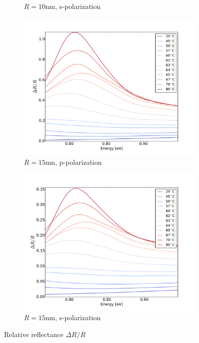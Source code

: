 \begin{figure}
\begin{subfigure}[b]{0.49\textwidth}
        \caption{$R=10$nm, s-polarization}
        \label{fig:five over x}
    \end{subfigure}
    \begin{subfigure}[b]{0.49\textwidth}
        \centering
        \includegraphics[width=\textwidth]{Results/Sim3/dR_lowE.pdf}
        \caption{$R=15$nm, p-polarization}
        \label{fig:three sin x}
    \end{subfigure}
    \begin{subfigure}[b]{0.49\textwidth}
        \centering
        \includegraphics[width=\textwidth]{Results/Sim4/dR_lowE.pdf}
        \caption{$R=15$nm, s-polarization}
        \label{fig:five over x}
    \end{subfigure}
    \caption{Relative reflectance $\Delta R/R$}
    \label{fig:three graphs}
\end{figure}


